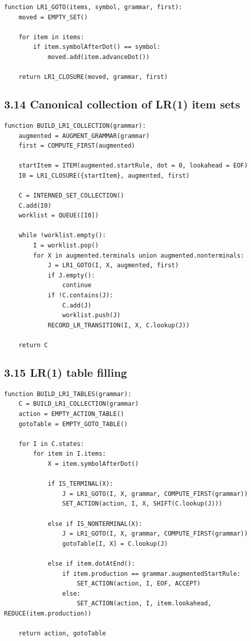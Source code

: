 \documentclass[10pt,letterpaper]{article}
\begin{document}
\begin{verbatim}
function LR1_GOTO(items, symbol, grammar, first):
    moved = EMPTY_SET()

    for item in items:
        if item.symbolAfterDot() == symbol:
            moved.add(item.advanceDot())

    return LR1_CLOSURE(moved, grammar, first)
\end{verbatim}

\subsection*{3.14 Canonical collection of LR(1) item sets}

\begin{verbatim}
function BUILD_LR1_COLLECTION(grammar):
    augmented = AUGMENT_GRAMMAR(grammar)
    first = COMPUTE_FIRST(augmented)

    startItem = ITEM(augmented.startRule, dot = 0, lookahead = EOF)
    I0 = LR1_CLOSURE({startItem}, augmented, first)

    C = INTERNED_SET_COLLECTION()
    C.add(I0)
    worklist = QUEUE([I0])

    while !worklist.empty():
        I = worklist.pop()
        for X in augmented.terminals union augmented.nonterminals:
            J = LR1_GOTO(I, X, augmented, first)
            if J.empty():
                continue
            if !C.contains(J):
                C.add(J)
                worklist.push(J)
            RECORD_LR_TRANSITION(I, X, C.lookup(J))

    return C
\end{verbatim}

\subsection*{3.15 LR(1) table filling}

\begin{verbatim}
function BUILD_LR1_TABLES(grammar):
    C = BUILD_LR1_COLLECTION(grammar)
    action = EMPTY_ACTION_TABLE()
    gotoTable = EMPTY_GOTO_TABLE()

    for I in C.states:
        for item in I.items:
            X = item.symbolAfterDot()

            if IS_TERMINAL(X):
                J = LR1_GOTO(I, X, grammar, COMPUTE_FIRST(grammar))
                SET_ACTION(action, I, X, SHIFT(C.lookup(J)))

            else if IS_NONTERMINAL(X):
                J = LR1_GOTO(I, X, grammar, COMPUTE_FIRST(grammar))
                gotoTable[I, X] = C.lookup(J)

            else if item.dotAtEnd():
                if item.production == grammar.augmentedStartRule:
                    SET_ACTION(action, I, EOF, ACCEPT)
                else:
                    SET_ACTION(action, I, item.lookahead, REDUCE(item.production))

    return action, gotoTable
\end{verbatim}
\end{document}
